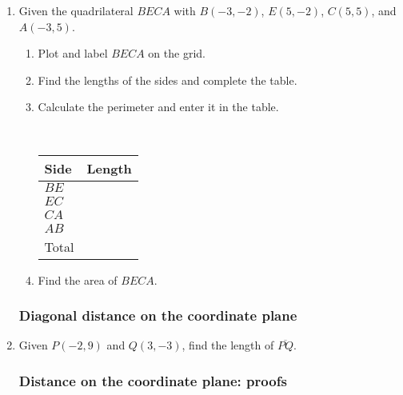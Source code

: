 \documentclass[12pt, twoside]{article}
\begin{document}
\begin{enumerate}
  \item Given the quadrilateral $BECA$ with $B(-3,-2)$, $E(5,-2)$, $C(5,5)$, and $A(-3,5)$.
    \begin{enumerate}
      \item Plot and label $BECA$ on the grid.
      \item Find the lengths of the sides and complete the table.
      \item Calculate the perimeter and enter it in the table.\\
        \begin{multicols}{2}
          \\
          \renewcommand{\arraystretch}{1.5}
          \begin{flushright}
          \begin{tabular}{|p{1cm}|p{2cm}|}
            \hline
            Side & Length \\
            \hline
            $BE$ & \\
            \hline
            $EC$ & \\
            \hline
            $CA$ & \\
            \hline
            $AB$ & \\
            \hline
            Total & \\
            \hline
          \end{tabular}
        \end{flushright}
        \end{multicols}
      \item Find the area of $BECA$.
    \end{enumerate}

\newpage
  \subsubsection*{Diagonal distance on the coordinate plane}
  \item Given $P(-2,9)$ and $Q(3,-3)$, find the length of $\overline{PQ}$.

  \subsubsection*{Distance on the coordinate plane: proofs}


\end{enumerate}
\end{document}
